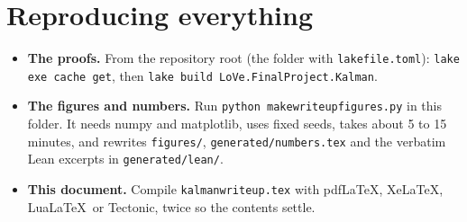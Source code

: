 \documentclass[11pt]{article}
\newcommand{\leanus}{\textunderscore\allowbreak}%
\newcommand{\lean}[1]{\begingroup\let\_\leanus\texttt{#1}\endgroup}
\begin{document}
\section{Reproducing everything}\label{app:reproduce}

\begin{itemize}
  \item \textbf{The proofs.} From the repository root (the folder with
    \lean{lakefile.toml}): \lean{lake exe cache get}, then
    \lean{lake build LoVe.Final\_Project.Kalman}.
  \item \textbf{The figures and numbers.} Run \lean{python make\_writeup\_figures.py} in this
    folder. It needs numpy and matplotlib, uses fixed seeds, takes about 5 to 15 minutes, and
    rewrites \lean{figures/}, \lean{generated/numbers.tex} and the verbatim Lean excerpts in
    \lean{generated/lean/}.
  \item \textbf{This document.} Compile \lean{kalman\_writeup.tex} with pdf\LaTeX, Xe\LaTeX,
    Lua\LaTeX\ or Tectonic, twice so the contents settle.
\end{itemize}
\end{document}
